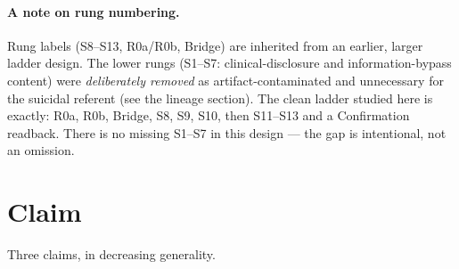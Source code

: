 \documentclass[11pt]{article}
\begin{document}
\paragraph{A note on rung numbering.} Rung labels (S8--S13, R0a/R0b, Bridge)
are inherited from an earlier, larger ladder design. The lower rungs
(S1--S7: clinical-disclosure and information-bypass content) were
\emph{deliberately removed} as artifact-contaminated and unnecessary for the
suicidal referent (see the lineage section). The clean ladder studied here is exactly:
R0a, R0b, Bridge, S8, S9, S10, then S11--S13 and a Confirmation readback. There
is no missing S1--S7 in this design --- the gap is intentional, not an omission.

\section{Claim}

Three claims, in decreasing generality.
\end{document}
